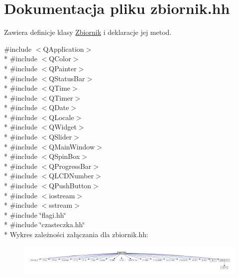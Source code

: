 \hypertarget{zbiornik_8hh}{}\section{Dokumentacja pliku zbiornik.\+hh}
\label{zbiornik_8hh}


Zawiera definicje klasy \hyperlink{class_zbiornik}{Zbiornik} i deklaracje jej metod.  


{\ttfamily \#include $<$Q\+Application$>$}\\*
{\ttfamily \#include $<$Q\+Color$>$}\\*
{\ttfamily \#include $<$Q\+Painter$>$}\\*
{\ttfamily \#include $<$Q\+Status\+Bar$>$}\\*
{\ttfamily \#include $<$Q\+Time$>$}\\*
{\ttfamily \#include $<$Q\+Timer$>$}\\*
{\ttfamily \#include $<$Q\+Date$>$}\\*
{\ttfamily \#include $<$Q\+Locale$>$}\\*
{\ttfamily \#include $<$Q\+Widget$>$}\\*
{\ttfamily \#include $<$Q\+Slider$>$}\\*
{\ttfamily \#include $<$Q\+Main\+Window$>$}\\*
{\ttfamily \#include $<$Q\+Spin\+Box$>$}\\*
{\ttfamily \#include $<$Q\+Progress\+Bar$>$}\\*
{\ttfamily \#include $<$Q\+L\+C\+D\+Number$>$}\\*
{\ttfamily \#include $<$Q\+Push\+Button$>$}\\*
{\ttfamily \#include $<$iostream$>$}\\*
{\ttfamily \#include $<$sstream$>$}\\*
{\ttfamily \#include \char`\"{}flagi.\+hh\char`\"{}}\\*
{\ttfamily \#include \char`\"{}czasteczka.\+hh\char`\"{}}\\*
Wykres zależności załączania dla zbiornik.\+hh\+:
\nopagebreak
\begin{figure}[H]
\begin{center}
\leavevmode
\includegraphics[width=350pt]{zbiornik_8hh__incl}
\end{center}
\end{figure}
